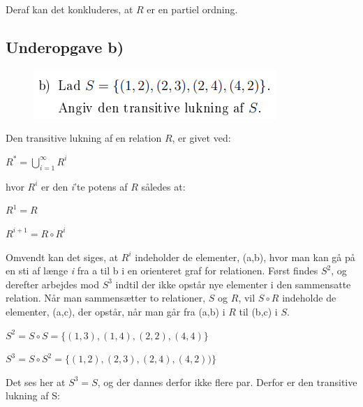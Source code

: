 \documentclass{article}
\begin{document}
Deraf kan det konkluderes, at $R$ er en partiel ordning.

\subsection{Underopgave b)}

\begin{figure}[h]
\begin{center}
\includegraphics[scale=0.9]{2015Opgave3FormuleringB}
\end{center}
\end{figure}

Den transitive lukning af en relation $R$, er givet ved:

\begin{center}
\begin{math}
R^* = \bigcup_{i = 1}^\infty R^i
\end{math}
\end{center}

hvor $R^i$ er den \emph{i}'te potens af $R$ således at:

\begin{center}
$R^1 = R$
\end{center}
\begin{center}
$R^{i+1} = R \circ R^i$
\end{center}

Omvendt kan det siges, at $R^i$ indeholder de elementer, (a,b), hvor man kan gå på en sti af længe \emph{i} fra a til b i en orienteret graf for relationen. Først findes $S^2$, og derefter arbejdes mod $S^3$ indtil der ikke opstår nye elementer i den sammensatte relation. Når man sammensætter to relationer, $S$ og $R$, vil $S \circ R$ indeholde de elementer, (a,c), der opstår, når man går fra (a,b) i $R$ til (b,c) i $S$.

\begin{center}
\begin{math}
S^2 = S \circ S = \{(1,3), (1,4), (2,2), (4,4)\}
\end{math}
\par
\begin{math}
S^3 = S \circ S^2 = \{(1,2), (2,3), (2,4), (4,2))\}
\end{math}
\end{center}
\par 
Det ses her at $S^3 = S$, og der dannes derfor ikke flere par. Derfor er den transitive lukning af S:
\end{document}
